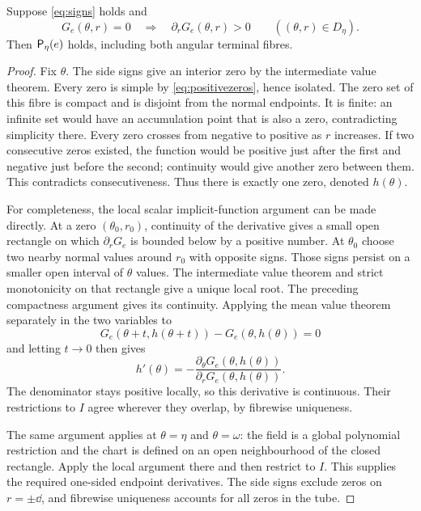 \documentclass[11pt,a4paper]{article}
\begin{document}
\begin{lemma}\label{lem:graph}
Suppose \eqref{eq:signs} holds and
\begin{equation}\label{eq:positivezeros}
 G_e(\theta,r)=0\quad\Longrightarrow\quad
 \partial_rG_e(\theta,r)>0\qquad ((\theta,r)\in D_\eta).
\end{equation}
Then $\mathsf P_\eta(e)$ holds, including both angular terminal fibres.
\end{lemma}
\begin{proof}
Fix $\theta$. The side signs give an interior zero by the intermediate
value theorem. Every zero is simple by \eqref{eq:positivezeros}, hence
isolated. The zero set of this fibre is compact and is disjoint from the
normal endpoints. It is finite: an infinite set would have an
accumulation point that is also a zero, contradicting simplicity there.
Every zero crosses from negative to positive as $r$ increases. If two
consecutive zeros existed, the function would be positive just after the
first and negative just before the second; continuity would give another
zero between them. This contradicts consecutiveness. Thus there is exactly
one zero, denoted $h(\theta)$.

For completeness, the local scalar implicit-function argument can be
made directly. At a zero $(\theta_0,r_0)$, continuity of the derivative
gives a small open rectangle on which $\partial_rG_e$ is bounded below
by a positive number. At $\theta_0$ choose two nearby normal values
around $r_0$ with opposite signs. Those signs persist on a smaller open
interval of $\theta$ values. The intermediate value theorem and strict
monotonicity on that rectangle give a unique local root. The preceding
compactness argument gives its continuity. Applying the mean value theorem
separately in the two variables to
\[
 G_e(\theta+t,h(\theta+t))-G_e(\theta,h(\theta))=0
\]
and letting $t\to0$ then gives
\begin{equation}\label{eq:hprime}
 h'(\theta)=-\frac{\partial_\theta G_e(\theta,h(\theta))}
                    {\partial_rG_e(\theta,h(\theta))}.
\end{equation}
The denominator stays positive locally, so this derivative is continuous.
Their restrictions to $I$ agree wherever they overlap, by fibrewise uniqueness.

The same argument applies at $\theta=\eta$ and $\theta=\omega$:
the field is a global polynomial restriction and the chart is defined on
an open neighbourhood of the closed rectangle. Apply the local argument
there and then restrict to $I$. This supplies the required one-sided
endpoint derivatives. The side signs exclude zeros on $r=\pm\dd$,
and fibrewise uniqueness accounts for all zeros in the tube.
\end{proof}
\end{document}
